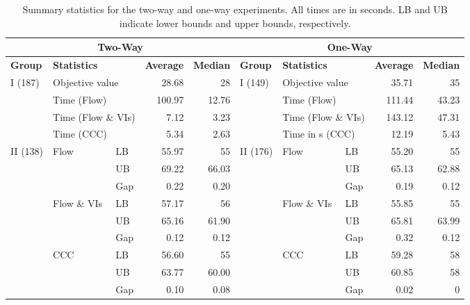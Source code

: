 \documentclass[10pt]{article}
\theoremstyle{definition}
\begin{document}
\begin{table}[htbp]
\small
  \centering
  \caption{Summary statistics for the two-way and one-way experiments. All times are in seconds. LB and UB indicate lower bounds and upper bounds, respectively.}
    \begin{tabular}{l|l|l|rr|l|l|l|rr}
    \hline
    \multicolumn{5}{c|}{\textbf{Two-Way}} & \multicolumn{5}{c}{\textbf{One-Way}} \\
    \hline
    \textbf{Group} & \multicolumn{2}{l|}{\textbf{Statistics}} & \textbf{Average} & \textbf{Median} & \textbf{Group} & \multicolumn{2}{l|}{\textbf{Statistics}} & \textbf{Average} & \textbf{Median} \\
    \hline
    \multirow{4}[2]{*}{I (187)} & \multicolumn{2}{l|}{Objective value} & 28.68 & 28    & \multirow{4}[2]{*}{I (149)} & \multicolumn{2}{l|}{Objective value} & 35.71 & 35 \\
          & \multicolumn{2}{l|}{Time (Flow)} & 100.97 & 12.76 &       & \multicolumn{2}{l|}{Time (Flow)} & 111.44 & 43.23 \\
          & \multicolumn{2}{l|}{Time (Flow \& VIs)} & 7.12  & 3.23  &       & \multicolumn{2}{l|}{Time (Flow \& VIs)} & 143.12 & 47.31 \\
          & \multicolumn{2}{l|}{Time (CCC)} & 5.34  & 2.63  &       & \multicolumn{2}{l|}{Time in s (CCC)} & 12.19 & 5.43 \\
    \hline
    \multirow{9}[6]{*}{II (138)} & \multirow{3}[2]{*}{Flow} & LB    & 55.97 & 55    & \multirow{9}[6]{*}{II (176)} & \multirow{3}[2]{*}{Flow} & LB    & 55.20 & 55 \\
          &       & UB    & 69.22 & 66.03 &       &       & UB    & 65.13 & 62.88 \\
          &       & Gap   & 0.22  & 0.20  &       &       & Gap   & 0.19  & 0.12 \\
\cline{2-5}\cline{7-10}          & \multirow{3}[2]{*}{Flow \& VIs} & LB    & 57.17 & 56    &       & \multirow{3}[2]{*}{Flow \& VIs} & LB    & 55.85 & 55 \\
          &       & UB    & 65.16 & 61.90 &       &       & UB    & 65.81 & 63.99 \\
          &       & Gap   & 0.12  & 0.12  &       &       & Gap   & 0.32  & 0.12 \\
\cline{2-5}\cline{7-10}          & \multirow{3}[2]{*}{CCC} & LB    & 56.60 & 55    &       & \multirow{3}[2]{*}{CCC} & LB    & 59.28 & 58 \\
          &       & UB    & 63.77 & 60.00 &       &       & UB    & 60.85 & 58 \\
          &       & Gap   & 0.10  & 0.08  &       &       & Gap   & 0.02  & 0 \\
    \hline
    \end{tabular}%
  \label{tab:summary_stats}%
\end{table}%
\end{document}
